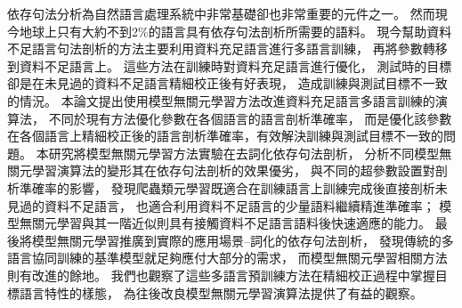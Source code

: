 \NTUtitlepage  %

\newpage
\setcounter{page}{1}


\iffalse
\mydoublespacing
\begin{acknowledgement} %
兩年來的碩士生活，隨著這份論文的誕生而告了一個段落。回思過去兩年來的生活，有做出成果的喜悅、也有處處碰壁時的苦悶、也有跟同學共同奮鬥的記憶，自己在這兩年中實在成長了許多，而這些都要感謝實驗室的大家長：李琳山教授。教授在實驗室營造了自由研究的氛圍，讓實驗室的同學都能按自己喜好自由發展研究方向，並從旁關心協助同學的研究。我在這樣的氛圍下也受益許多，學習到了許多做研究與做人處事的方法。

這些研究能夠順利完成要由衷地感謝我的家人，他們無論何時都支持我的決定，並且從旁給我協助，在我最忙碌而都很晚回家的那段時間，他們也是很包容我，並給予我支持。

與實驗室的同學相處的這段時光將是碩士生活中最難忘的一段日子，我們無論是修課或是研究上都是彼此的好戰友，我從你們身上都學到很多；下一屆的你們將是實驗室下一代的主力，祝你們未來研究順利！

最後要感謝我的朋友、同學、以及伙伴們，不論是平常一起吃飯聊天、有正事時的一起奮鬥、或一起出去玩，你們都是我平常生活上最大的支持！

\end{acknowledgement}
\fi
\begin{zhAbstract}  %
依存句法分析為自然語言處理系統中非常基礎卻也非常重要的元件之一。
然而現今地球上只有大約不到2\%的語言具有依存句法剖析所需要的語料。
現今幫助資料不足語言句法剖析的方法主要利用資料充足語言進行多語言訓練，
再將參數轉移到資料不足語言上。
這些方法在訓練時對資料充足語言進行優化，
測試時的目標卻是在未見過的資料不足語言精細校正後有好表現，
造成訓練與測試目標不一致的情況。
本論文提出使用模型無關元學習方法改進資料充足語言多語言訓練的演算法，
不同於現有方法優化參數在各個語言的語言剖析準確率，
而是優化該參數在各個語言上精細校正後的語言剖析準確率，有效解決訓練與測試目標不一致的問題。
本研究將模型無關元學習方法實驗在去詞化依存句法剖析，
分析不同模型無關元學習演算法的變形其在依存句法剖析的效果優劣，
與不同的超參數設置對剖析準確率的影響，
發現爬蟲類元學習既適合在訓練語言上訓練完成後直接剖析未見過的資料不足語言，
也適合利用資料不足語言的少量語料繼續精進準確率；
模型無關元學習與其一階近似則具有接觸資料不足語言語料後快速適應的能力。
最後將模型無關元學習推廣到實際的應用場景--詞化的依存句法剖析，
發現傳統的多語言協同訓練的基準模型就足夠應付大部分的需求，
而模型無關元學習相關方法則有改進的餘地。
我們也觀察了這些多語言預訓練方法在精細校正過程中掌握目標語言特性的樣態，
為往後改良模型無關元學習演算法提供了有益的觀察。

\end{zhAbstract}
